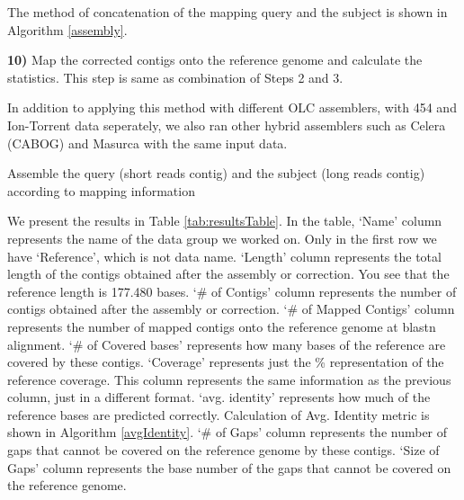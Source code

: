 \documentclass{bioinfo}
\begin{document}
The method of concatenation of the mapping query and the subject is shown in Algorithm \ref{assembly}. 

\textbf{10)} Map the corrected contigs onto the reference genome and calculate the statistics. This step is same as combination of Steps 2 and 3.

In addition to applying this method with different OLC assemblers, with 454 and Ion-Torrent data seperately, we also ran other hybrid assemblers such as Celera (CABOG)\cite{cabogMiller:2008} and Masurca \cite{masurcaZimin:2013} with the same input data. 

\begin{algorithm}
\caption{Assemble the query (short reads contig) and the subject (long reads contig) according to mapping information}
\label{assembly}
\begin{algorithmic} 
\ENDIF
{}
\ENDIF
{}
\ENDIF
{}
\ENDIF
\end{algorithmic}
\end{algorithm}


We present the results in Table \ref{tab:resultsTable}. In the table, `Name' column represents the name of the data group we worked on. Only in the first row we have `Reference', which is not data name. `Length' column represents the total length of the contigs obtained after the assembly or correction. You see that the reference length is 177.480 bases. `\# of Contigs' column represents the number of contigs obtained after the assembly or correction. `\# of Mapped Contigs' column represents the number of mapped contigs onto the reference genome at blastn alignment. `\# of Covered bases' represents how many bases of the reference are covered by these contigs. `Coverage' represents just the \% representation of the reference coverage. This column represents the same information as the previous column, just in a different format. `avg. identity' represents how much of the reference bases are predicted correctly. Calculation of Avg. Identity metric is shown in Algorithm  \ref{avgIdentity}. `\# of Gaps' column represents the number of gaps that cannot be covered on the reference genome by these contigs. `Size of Gaps' column represents the base number of the gaps that cannot be covered on the reference genome.
\end{document}
